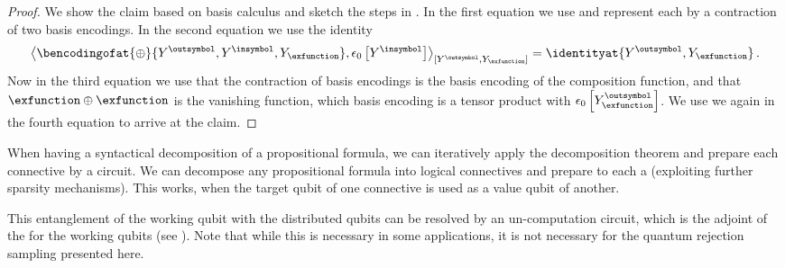 \begin{proof}
    We show the claim based on basis calculus and sketch the steps in .
    In the first equation we use  and represent each \computationCircuit{} by a contraction of two basis encodings.
    In the second equation we use the identity
    \begin{align*}
        \contractionof{\bencodingofat{\oplus}{\cheadvariable{\outsymbol},\cheadvariable{\insymbol},\headvariableof{\exfunction}},
            \fbasisat{\cheadvariable{\insymbol}}}{\cheadvariable{\outsymbol},\headvariableof{\exfunction}}
        = \identityat{\cheadvariable{\outsymbol},\headvariableof{\exfunction}} \, .
    \end{align*}
    Now in the third equation we use that the contraction of basis encodings is the basis encoding of the composition function, and that $\exfunction\oplus\exfunction$ is the vanishing function, which basis encoding is a tensor product with $\fbasisat{\cheadvariableof{\exfunction}{\outsymbol}}$.
    We use we  again in the fourth equation to arrive at the claim.
\end{proof}

When having a syntactical decomposition of a propositional formula, we can iteratively apply the \computationCircuit{} decomposition theorem and prepare each connective by a circuit.
We can decompose any propositional formula into logical connectives and prepare to each a \computationCircuit{} (exploiting further sparsity mechanisms).
This works, when the target qubit of one connective is used as a value qubit of another.

This entanglement of the working qubit with the distributed qubits can be resolved by an un-computation circuit, which is the adjoint of the \computationCircuit{} for the working qubits (see ).
Note that while this is necessary in some applications, it is not necessary for the quantum rejection sampling presented here.

